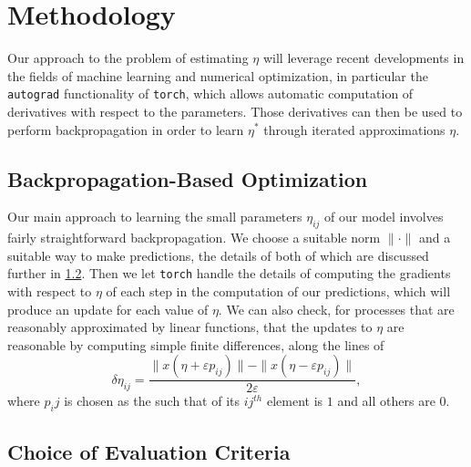 \documentclass[12pt]{article}
\begin{document}





\section{Methodology}\label{methodology}


Our approach to the problem of estimating $\eta$ will leverage recent developments in the fields of machine learning and numerical optimization, in particular the \texttt{autograd} functionality of \texttt{torch}, which allows automatic computation of derivatives with respect to the parameters.\cite{biggs} Those derivatives can then be used to perform backpropagation in order to learn $\eta^*$ through iterated approximations $\eta$.



\subsection{Backpropagation-Based Optimization}

Our main approach to learning the small parameters $\eta_{ij}$ of our model involves fairly straightforward backpropagation. We choose a suitable norm $\|\cdot\|$ and a suitable way to make predictions, the details of both of which are discussed further in \ref{norms}. Then we let \texttt{torch} handle the details of computing the gradients with respect to $\eta$ of each step in the computation of our predictions, which will produce an update for each value of $\eta$. We can also check, for processes that are reasonably approximated by linear functions, that the updates to $\eta$ are reasonable by computing simple finite differences, along the lines of $$\delta\eta_{ij} = \frac{ \| x(\eta + \varepsilon p_{ij}) \| - \| x(\eta - \varepsilon p_{ij}) \| }{2 \varepsilon},$$ where $p_ij$ is chosen as the such that of its $ij^{th}$ element is $1$ and all others are $0$.



\subsection{Choice of Evaluation Criteria}\label{norms}
\end{document}
